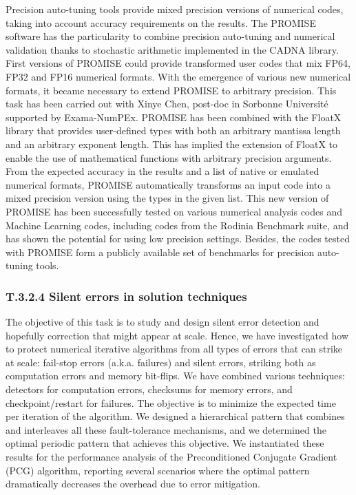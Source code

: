 Precision auto-tuning tools provide mixed precision versions of
numerical codes, taking into account accuracy requirements on the results. 
The PROMISE software has the particularity to combine precision auto-tuning and numerical validation thanks to stochastic arithmetic implemented in the CADNA library. First versions of PROMISE 
could provide transformed user codes that mix FP64, FP32 and FP16 numerical formats. 
With the emergence of various new numerical formats, it became necessary to extend PROMISE to arbitrary precision. This task has been carried out with
Xinye Chen, post-doc in Sorbonne Université supported by Exama-NumPEx. 
PROMISE has been combined with the FloatX library that provides user-defined types with both an arbitrary mantissa length and an arbitrary exponent length. 
This has implied the extension of FloatX to enable the use of mathematical functions with arbitrary precision arguments. 
From the expected accuracy in the results and a list of native or emulated numerical formats, PROMISE automatically transforms an input code into a mixed precision version using the types in the given list. This new version of PROMISE has been successfully tested on various numerical analysis
codes and Machine Learning codes, including codes from the Rodinia Benchmark suite, and has shown the potential for using low precision settings. 
Besides, the codes tested with PROMISE form a publicly available set of benchmarks for precision auto-tuning tools.



\subsubsection{ 
T.3.2.4 Silent errors in solution techniques
}
 The objective of this task is to study and design silent
error detection and hopefully correction that might appear at scale.  
Hence, we have investigated how to protect numerical iterative algorithms from all types of errors that can strike at scale: fail-stop errors (a.k.a. failures) and silent errors, striking both as computation errors
 and memory bit-flips. We have combined various techniques: detectors for computation errors,
  checksums for memory errors,  and checkpoint/restart for failures.  The objective is to minimize the expected time per iteration of the algorithm. We designed a hierarchical pattern that combines and interleaves all these fault-tolerance mechanisms, and we determined
  the optimal periodic pattern that achieves this objective. We instantiated these results for the performance analysis of the Preconditioned Conjugate Gradient (PCG) algorithm, reporting several scenarios where the optimal pattern dramatically decreases the overhead due to error mitigation.

